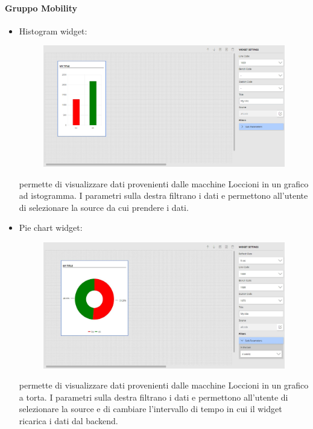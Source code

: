 \paragraph{Gruppo Mobility}
\begin{itemize}
    \item Histogram widget: 
    
\begin{figure}[ht]
\centering
\includegraphics[scale=0.265]{images/Histogram.png}
\end{figure}
permette di visualizzare dati provenienti dalle macchine Loccioni in un grafico ad istogramma. I parametri sulla destra filtrano i dati e permettono all'utente di selezionare la source da cui prendere i dati.
\end{itemize}
\pagebreak
\begin{itemize}
    \item Pie chart widget: 
    
\begin{figure}[ht]
\centering
\includegraphics[scale=0.32]{images/Piechart.JPG}
\end{figure}
permette di visualizzare dati provenienti dalle macchine Loccioni in un grafico a torta. I parametri sulla destra filtrano i dati e permettono all'utente di selezionare la source e di cambiare l'intervallo di tempo in cui il widget ricarica i dati dal backend.
\end{itemize}
